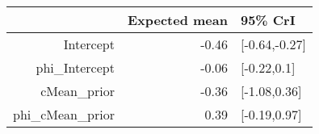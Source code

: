 \begin{tabular}{rrl}
  \hline
 & Expected mean & 95\% CrI \\ 
  \hline
Intercept & -0.46 & [-0.64,-0.27] \\ 
  phi\_Intercept & -0.06 & [-0.22,0.1] \\ 
  cMean\_prior & -0.36 & [-1.08,0.36] \\ 
  phi\_cMean\_prior & 0.39 & [-0.19,0.97] \\ 
   \hline
\end{tabular}

